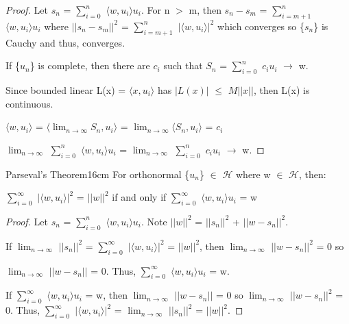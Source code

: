     \begin{proof}
        Let $s_n$ = $\sum_{i=0}^{n}$ $\langle w , u_i \rangle u_i$.
        For n $>$ m, then $s_n - s_m$
        = $\sum_{i=m+1}^{n}$ $\langle w , u_i \rangle u_i$
        where $||s_n - s_m||^2$
        = $\sum_{i=m+1}^{n}$ $|\langle w , u_i \rangle|^2$
        which converges so \{$s_n$\} is Cauchy and thus, converges.

        If \{$u_n$\} is complete, then there are $c_i$ such that
        $S_n$ = $\sum_{i=0}^n$ $c_i u_i$ $\rightarrow$ w.

        Since bounded linear L(x) = $\langle x , u_i \rangle$
        has $|L(x)|$ $\leq$ $M||x||$, then L(x) is continuous.

        \hspace{0.5cm}
        $\langle w , u_i \rangle$
        = $\langle \lim_{n \rightarrow \infty} S_n , u_i \rangle$
        = $\lim_{n \rightarrow \infty} \langle S_n , u_i \rangle$
        = $c_i$

        \hspace{0.5cm}
        $\lim_{n \rightarrow \infty}$ $\sum_{i=0}^{n}$ $\langle w , u_i \rangle u_i$
        = $\lim_{n \rightarrow \infty}$ $\sum_{i=0}^n$ $c_i u_i$ $\rightarrow$ w.
    \end{proof}

    \newpage



    \begin{wtheorem}{Parseval's Theorem}{16cm}
        For orthonormal \{$u_n$\} $\in$ $\mathcal{H}$ where w $\in$ $\mathcal{H}$,
        then:
        
        \hspace{0.5cm}
        $\sum_{i=0}^{\infty}$ $|\langle w , u_i \rangle|^2$ = $||w||^2$
        if and only if $\sum_{i=0}^{\infty}$ $\langle w , u_i \rangle u_i$ = w
    \end{wtheorem}

    \begin{proof}
        Let $s_n$ = $\sum_{i=0}^{n}$ $\langle w , u_i \rangle u_i$.
        Note $||w||^2$ = $||s_n||^2$ + $||w-s_n||^2$.

        If $\lim_{n \rightarrow \infty}$ $||s_n||^2$
        = $\sum_{i=0}^{\infty}$ $|\langle w , u_i \rangle|^2$ = $||w||^2$,
        then $\lim_{n \rightarrow \infty}$ $||w-s_n||^2$ = 0 so
        
        $\lim_{n \rightarrow \infty}$ $||w-s_n||$ = 0.
        Thus, $\sum_{i=0}^{\infty}$ $\langle w , u_i \rangle u_i$ = w.

        If $\sum_{i=0}^{\infty}$ $\langle w , u_i \rangle u_i$ = w,
        then $\lim_{n \rightarrow \infty}$ $||w-s_n||$ = 0
        so $\lim_{n \rightarrow \infty}$ $||w-s_n||^2$ = 0.
        Thus, $\sum_{i=0}^{\infty}$ $|\langle w , u_i \rangle|^2$
        = $\lim_{n \rightarrow \infty}$ $||s_n||^2$ = $||w||^2$.
    \end{proof}

